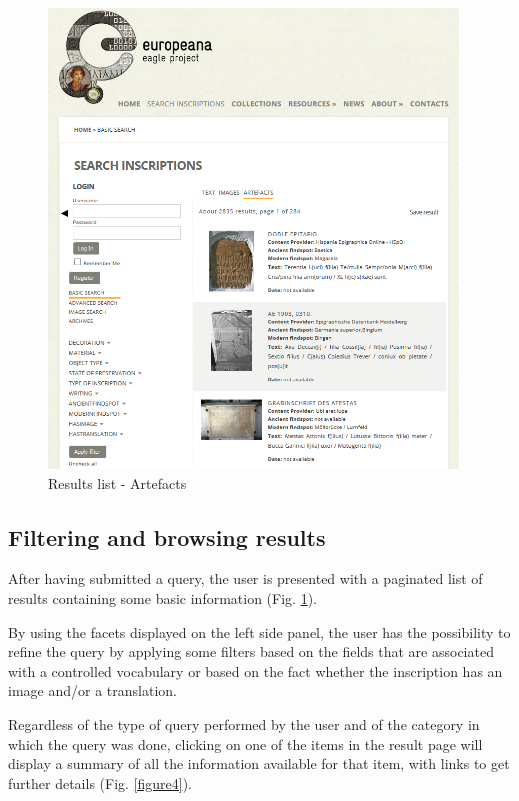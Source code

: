 \documentclass[amsthm,ebook]{saparticle}
\begin{document}
\begin{figure}[!bp]
\centering
 \includegraphics[width=10.874cm,height=12.197cm]{EAGLE2016submissionXX-img003.png} 
\caption{Results list - Artefacts}
\label{figure3}
\end{figure}

\subsection{Filtering and browsing results}

\noindent After having submitted a query, the user is presented with a paginated list of results containing some basic information (Fig. \ref{figure3}). 

By using the facets displayed on the left side panel, the user has the possibility to refine the query by applying some
filters based on the fields that are associated with a controlled vocabulary or based on the fact whether the
inscription has an image and/or a translation.

Regardless of the type of query performed by the user and of the category in which the query was done, clicking on one
of the items in the result page will display a summary of all the information available for that item, with links to
get further details (Fig. \ref{figure4}).
\end{document}
